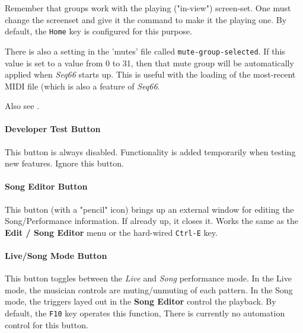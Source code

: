 \documentclass[
 11pt,
 twoside,
 a4paper,
 final                                 %
]{article}
\begin{document}
   Remember that groups work with the playing ("in-view") screen-set.
   One must change the screenset and give it the command to make it the
   playing one.
   By default, the \texttt{Home} key is configured for this purpose.

   There is also a setting in the 'mutes' file called
   \texttt{mute-group-selected}.  If this value is set to a value from 0 to 31,
   then that mute group will be automatically applied when
   \textsl{Seq66} starts up.
   This is useful with the loading of the most-recent MIDI file (which is also
   a feature of \textsl{Seq66}.

   Also see .

\paragraph{Developer Test Button}
\label{paragraph:introduction_developer_test_button}

   This button is always disabled.  Functionality is added temporarily when
   testing new features. Ignore this button.

\paragraph{Song Editor Button}
\label{paragraph:introduction_song_editor_button}

   This button (with a "pencil" icon)
   brings up an external window for editing the Song/Performance
   information.  If already up, it closes it.  Works the same as the
   \textbf{Edit / Song Editor} menu or the hard-wired \texttt{Ctrl-E} key.

\paragraph{Live/Song Mode Button}
\label{paragraph:introduction_livesong_mode_button}

   This button toggles between the \textsl{Live} and \textsl{Song} performance
   mode. In the Live mode, the musician controls are muting/unmuting of each
   pattern.  In the Song mode, the triggers layed out in the
   \textbf{Song Editor} control the playback.
   By default, the \texttt{F10} key operates this function,
   There is currently no automation control for this button.

\begin{comment}
   \itempar{Toggle Tracks}{pattern!toggle tracks}
   \index{pattern!toggle tracks}
   This button changes the status of all of the
   \textsl{playing} tracks, reversing the
   mute status of each pattern that is playing.
   The next click will then unmute only those tracks.
   Because it can be confusing, this button is disabled (not shown
   in the figure) in Song mode.

   LATER:  Describe
   \texttt{Ctrl-M},
   \texttt{Ctrl-U}, and
   \texttt{Ctrl-T}.

\end{comment}
\end{document}
